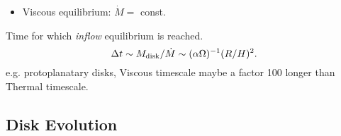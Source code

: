 \documentclass[11pt,a4paper]{article}
\begin{document}
\begin{itemize}
  \item Viscous equilibrium:   $\dot{M} =$ const. 
\end{itemize}
Time for which {\it inflow} equilibrium is reached. 
\begin{equation}
  \Delta t \sim M_{\rm disk}/\dot{M}   \sim  (\alpha \Omega)^{-1} (R/H)^2. 
\end{equation}
e.g. protoplanatary disks, Viscous timescale maybe a factor 100 longer
than Thermal timescale. 

\subsection{Disk Evolution}





\end{document}

